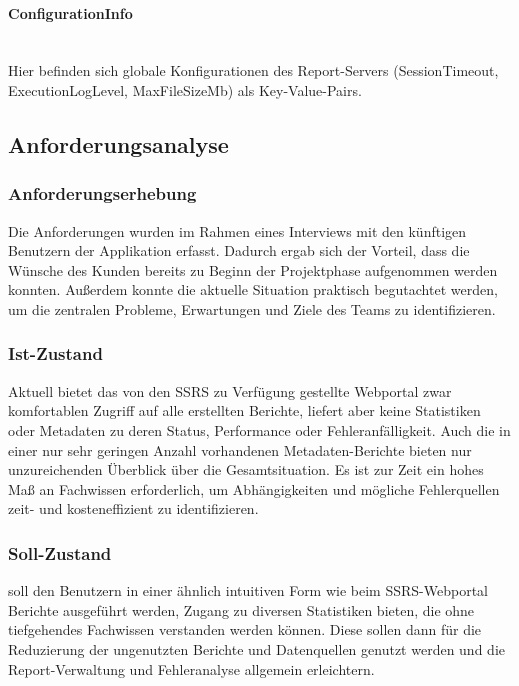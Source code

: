 \paragraph{ConfigurationInfo} ~\\
Hier befinden sich globale Konfigurationen des Report-Servers (SessionTimeout, ExecutionLogLevel, MaxFileSizeMb) als Key-Value-Pairs.

\subsection{Anforderungsanalyse}
\label{sec:Anforderungsanalyse}

\subsubsection{Anforderungserhebung}
\label{sec:Anforderungserhebung}
Die Anforderungen wurden im Rahmen eines Interviews mit den künftigen Benutzern der Applikation erfasst. Dadurch ergab sich der Vorteil, dass die Wünsche des Kunden bereits zu Beginn der Projektphase aufgenommen werden konnten. Außerdem konnte die aktuelle Situation praktisch begutachtet werden, um die zentralen Probleme, Erwartungen und Ziele des Teams \teamName zu identifizieren.

\subsubsection{Ist-Zustand}
\label{sec:Ist}
Aktuell bietet das von den \ac{SSRS} zu Verfügung gestellte Webportal zwar komfortablen Zugriff auf alle erstellten Berichte, liefert aber keine Statistiken oder Metadaten zu deren Status, Performance oder Fehleranfälligkeit. Auch die in einer nur sehr geringen Anzahl vorhandenen Metadaten-Berichte bieten nur unzureichenden Überblick über die Gesamtsituation. Es ist zur Zeit ein hohes Maß an Fachwissen erforderlich, um Abhängigkeiten und mögliche Fehlerquellen zeit- und kosteneffizient zu identifizieren.

\subsubsection{Soll-Zustand}
\label{sec:Soll}
\projektName soll den Benutzern in einer ähnlich intuitiven Form wie beim \ac{SSRS}-Webportal Berichte ausgeführt werden, Zugang zu diversen Statistiken bieten, die ohne tiefgehendes Fachwissen verstanden werden können. Diese sollen dann für die Reduzierung der ungenutzten Berichte und Datenquellen genutzt werden und die Report-Verwaltung und Fehleranalyse allgemein erleichtern.


